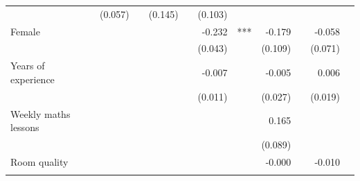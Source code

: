 \documentclass{article}
\begin{document}
\begin{table}[!h]
\begin{tabular}{lllllllllll}
  \multicolumn{1}{l}{} &
  \multicolumn{1}{r}{(0.057)} &
  \multicolumn{1}{l}{} &
  \multicolumn{1}{r}{(0.145)} &
  \multicolumn{1}{l}{} &
  \multicolumn{1}{r}{(0.103)} &
  \multicolumn{1}{l}{} \\
\multicolumn{1}{l}{Female} &
  \multicolumn{1}{r}{} &
  \multicolumn{1}{l}{} &
  \multicolumn{1}{r}{} &
  \multicolumn{1}{l}{} &
  \multicolumn{1}{r}{-0.232} &
  \multicolumn{1}{l}{***} &
  \multicolumn{1}{r}{-0.179} &
  \multicolumn{1}{l}{} &
  \multicolumn{1}{r}{-0.058} &
  \multicolumn{1}{l}{} \\
\multicolumn{1}{l}{} &
  \multicolumn{1}{r}{} &
  \multicolumn{1}{l}{} &
  \multicolumn{1}{r}{} &
  \multicolumn{1}{l}{} &
  \multicolumn{1}{r}{(0.043)} &
  \multicolumn{1}{l}{} &
  \multicolumn{1}{r}{(0.109)} &
  \multicolumn{1}{l}{} &
  \multicolumn{1}{r}{(0.071)} &
  \multicolumn{1}{l}{} \\
\multicolumn{1}{l}{Years of experience} &
  \multicolumn{1}{r}{} &
  \multicolumn{1}{l}{} &
  \multicolumn{1}{r}{} &
  \multicolumn{1}{l}{} &
  \multicolumn{1}{r}{-0.007} &
  \multicolumn{1}{l}{} &
  \multicolumn{1}{r}{-0.005} &
  \multicolumn{1}{l}{} &
  \multicolumn{1}{r}{0.006} &
  \multicolumn{1}{l}{} \\
\multicolumn{1}{l}{} &
  \multicolumn{1}{r}{} &
  \multicolumn{1}{l}{} &
  \multicolumn{1}{r}{} &
  \multicolumn{1}{l}{} &
  \multicolumn{1}{r}{(0.011)} &
  \multicolumn{1}{l}{} &
  \multicolumn{1}{r}{(0.027)} &
  \multicolumn{1}{l}{} &
  \multicolumn{1}{r}{(0.019)} &
  \multicolumn{1}{l}{} \\
\multicolumn{1}{l}{Weekly maths lessons} &
  \multicolumn{1}{r}{} &
  \multicolumn{1}{l}{} &
  \multicolumn{1}{r}{} &
  \multicolumn{1}{l}{} &
  \multicolumn{1}{r}{} &
  \multicolumn{1}{l}{} &
  \multicolumn{1}{r}{0.165} &
  \multicolumn{1}{l}{} &
  \multicolumn{1}{r}{} &
  \multicolumn{1}{l}{} \\
\multicolumn{1}{l}{} &
  \multicolumn{1}{r}{} &
  \multicolumn{1}{l}{} &
  \multicolumn{1}{r}{} &
  \multicolumn{1}{l}{} &
  \multicolumn{1}{r}{} &
  \multicolumn{1}{l}{} &
  \multicolumn{1}{r}{(0.089)} &
  \multicolumn{1}{l}{} &
  \multicolumn{1}{r}{} &
  \multicolumn{1}{l}{} \\
\multicolumn{1}{l}{Room quality} &
  \multicolumn{1}{r}{} &
  \multicolumn{1}{l}{} &
  \multicolumn{1}{r}{} &
  \multicolumn{1}{l}{} &
  \multicolumn{1}{r}{} &
  \multicolumn{1}{l}{} &
  \multicolumn{1}{r}{-0.000} &
  \multicolumn{1}{l}{} &
  \multicolumn{1}{r}{-0.010} &
  \multicolumn{1}{l}{} \\
\multicolumn{1}{l}{} &

\end{tabular}
\end{table}
\end{document}
